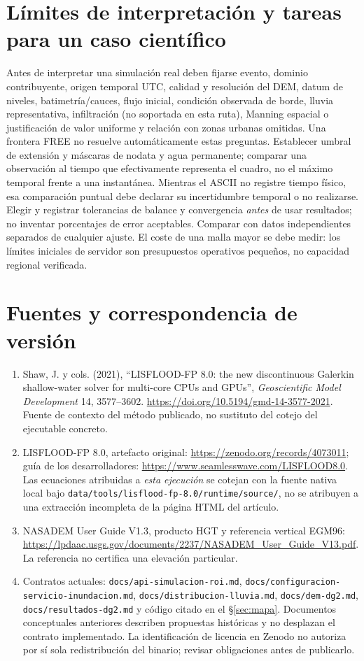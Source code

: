\documentclass[11pt,a4paper]{article}
\newcommand{\src}[1]{\nolinkurl{#1}}
\begin{document}
\section{Límites de interpretación y tareas para un caso científico}
\label{sec:limites}
Antes de interpretar una simulación real deben fijarse evento, dominio contribuyente, origen temporal UTC, calidad y resolución del DEM, datum de niveles, batimetría/cauces, flujo inicial, condición observada de borde, lluvia representativa, infiltración (no soportada en esta ruta), Manning espacial o justificación de valor uniforme y relación con zonas urbanas omitidas. Una frontera FREE no resuelve automáticamente estas preguntas. Establecer umbral de extensión y máscaras de nodata y agua permanente; comparar una observación al tiempo que efectivamente representa el cuadro, no el máximo temporal frente a una instantánea. Mientras el ASCII no registre tiempo físico, esa comparación puntual debe declarar su incertidumbre temporal o no realizarse. Elegir y registrar tolerancias de balance y convergencia \emph{antes} de usar resultados; no inventar porcentajes de error aceptables. Comparar con datos independientes separados de cualquier ajuste. El coste de una malla mayor se debe medir: los límites iniciales de servidor son presupuestos operativos pequeños, no capacidad regional verificada.

\section{Fuentes y correspondencia de versión}
\begin{enumerate}
\item Shaw, J. y cols. (2021), ``LISFLOOD-FP 8.0: the new discontinuous Galerkin shallow-water solver for multi-core CPUs and GPUs'', \emph{Geoscientific Model Development} 14, 3577--3602. \url{https://doi.org/10.5194/gmd-14-3577-2021}. Fuente de contexto del método publicado, no sustituto del cotejo del ejecutable concreto.
\item LISFLOOD-FP 8.0, artefacto original: \url{https://zenodo.org/records/4073011}; guía de los desarrolladores: \url{https://www.seamlesswave.com/LISFLOOD8.0}. Las ecuaciones atribuidas a \emph{esta ejecución} se cotejan con la fuente nativa local bajo \src{data/tools/lisflood-fp-8.0/runtime/source/}, no se atribuyen a una extracción incompleta de la página HTML del artículo.
\item NASADEM User Guide V1.3, producto HGT y referencia vertical EGM96: \url{https://lpdaac.usgs.gov/documents/2237/NASADEM_User_Guide_V13.pdf}. La referencia no certifica una elevación particular.
\item Contratos actuales: \src{docs/api-simulacion-roi.md}, \src{docs/configuracion-servicio-inundacion.md}, \src{docs/distribucion-lluvia.md}, \src{docs/dem-dg2.md}, \src{docs/resultados-dg2.md} y código citado en el \S\ref{sec:mapa}. Documentos conceptuales anteriores describen propuestas históricas y no desplazan el contrato implementado. La identificación de licencia en Zenodo no autoriza por sí sola redistribución del binario; revisar obligaciones antes de publicarlo.
\end{enumerate}
\end{document}

